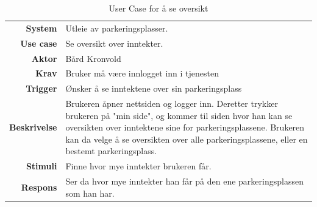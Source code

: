 \begin{table}[H]
\begin{tabularx}{\textwidth}{r|X}
\textbf{System}      & Utleie av parkeringsplasser. \\ [.5em]
\textbf{Use case}    & Se oversikt over inntekter.  \\ [.5em]
\textbf{Aktor}       & Bård Kronvold   \\ [.5em]
\textbf{Krav}        & Bruker må være innlogget inn i tjenesten \\ [.5em]
\textbf{Trigger}     & Ønsker å se inntektene over sin parkeringsplass \\ [.5em]
\textbf{Beskrivelse} & Brukeren åpner nettsiden og logger inn. Deretter trykker brukeren på  "min side", og kommer til siden hvor han kan se oversikten over inntektene sine for parkeringsplassene. Brukeren kan da velge å se oversikten over alle parkeringsplassene, eller en bestemt parkeringsplass. \vspace{0.5em} \\ 
\textbf{Stimuli}     & Finne hvor mye inntekter brukeren får.\\ [.5em]
\textbf{Respons}     & Ser da hvor mye inntekter han får på den ene  parkeringsplassen som han har.
\end{tabularx}
    \caption{User Case for å se oversikt}
    \label{tab:bård_se_oversikt}
\end{table}


